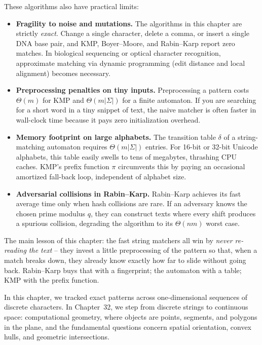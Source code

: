 These algorithms also have practical limits:
\begin{itemize}
  \item \textbf{Fragility to noise and mutations.} The algorithms in this chapter
        are strictly \emph{exact}. Change a single character, delete a comma, or
        insert a single DNA base pair, and KMP, Boyer--Moore, and Rabin--Karp
        report zero matches. In biological sequencing or optical character
        recognition, approximate matching via dynamic programming (edit distance
        and local alignment) becomes necessary.
  \item \textbf{Preprocessing penalties on tiny inputs.} Preprocessing a pattern
        costs $\Theta(m)$ for KMP and $\Theta(m|\Sigma|)$ for a finite
        automaton. If you are searching for a short word in a tiny snippet of text,
        the naive matcher is often faster in wall-clock time because it pays zero
        initialization overhead.
  \item \textbf{Memory footprint on large alphabets.} The transition table
        $\delta$ of a string-matching automaton requires $\Theta(m|\Sigma|)$
        entries. For 16-bit or 32-bit Unicode alphabets, this table easily swells
        to tens of megabytes, thrashing CPU caches. KMP's prefix function $\pi$
        circumvents this by paying an occasional amortized fall-back loop, independent
        of alphabet size.
  \item \textbf{Adversarial collisions in Rabin--Karp.} Rabin--Karp achieves its
        fast average time only when hash collisions are rare. If an adversary
        knows the chosen prime modulus $q$, they can construct texts where every
        shift produces a spurious collision, degrading the algorithm to its
        $\Theta(nm)$ worst case.
\end{itemize}

\begin{recoverybox}
The main lesson of this chapter: the fast string
matchers all win by \emph{never re-reading the text} -- they invest a little
preprocessing of the pattern so that, when a match breaks down, they already know
exactly how far to slide without going back. Rabin--Karp buys that with a
fingerprint; the automaton with a table; KMP with the prefix function.
\end{recoverybox}

In this chapter, we tracked exact patterns across one-dimensional sequences of discrete characters. In Chapter~32, we step from discrete strings to continuous space: computational geometry, where objects are points, segments, and polygons in the plane, and the fundamental questions concern spatial orientation, convex hulls, and geometric intersections.

